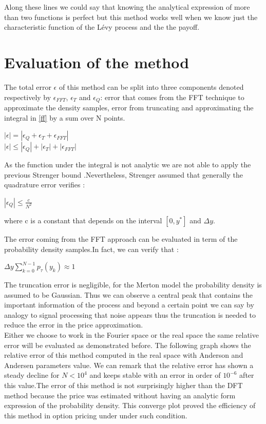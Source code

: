 \documentclass[12pt]{report}
\begin{document}
 Along these lines we could say that knowing the analytical expression of  more than two functions is perfect but this method works well when we know just the characteristic function of the Lévy process and the the payoff.  
\section{Evaluation of the method}

The total error $\epsilon$ of this method can be split into three components denoted respectively by $\epsilon_{FFT}$, $\epsilon_T$ and $\epsilon_Q$: error that comes from  the FFT technique to approximate the density samples, error from truncating and  approximating the integral in \eqref{ff} by a sum over N points.\\

\begin{center}
$|\epsilon|=|\epsilon_Q+\epsilon_T+\epsilon_{FFT}|$\\
$|\epsilon| \leq |\epsilon_Q|+|\epsilon_T|+|\epsilon_{FFT}|$\\
\end{center} 

As the function under the integral is not analytic we are not able to apply the previous Strenger bound .Nevertheless, Strenger assumed that generally the quadrature error verifies :
\begin{center}
$|\epsilon_Q| \leq \frac{c}{N^2}$
\end{center}
where c is a constant that depends on the interval $[0 ,y^*]$ and $\Delta y$.

The error coming from the FFT approach can be evaluated in term of the probability density samples.In fact, we can verify that :
\begin{center}
$ \Delta y \sum_{k=0}^{N-1}p_{\tau}(y_k) \approx 1$
\end{center}
 
The truncation error is negligible, for the Merton model the probability density is assumed to be Gaussian. Thus we can observe a central peak that contains the important information of the process and beyond a certain point we can say by analogy to signal processing that noise appears thus the truncation is needed to reduce the error in the price approximation. \\
  

Either we choose to work in the Fourier space or the real space the same relative error will be evaluated as demonstrated before. The following graph shows the relative error of this method computed in the real space with Anderson and Andersen parameters value. We can remark that the relative error has shown a steady decline for $N < 10^4$ and keeps stable with an error in order of $10^{-6}$ after this value.The error of this method is not surprisingly  higher than the DFT method because the price was estimated without having an analytic form expression of the probability density. This converge plot proved the efficiency of this method in option pricing under under such condition.  \\
\end{document}
